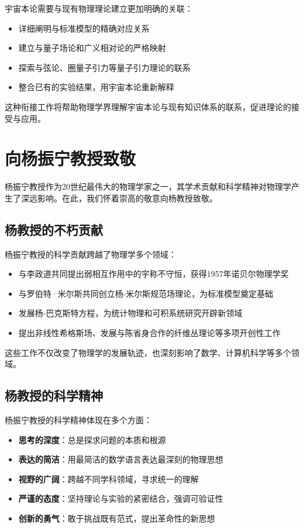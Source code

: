 宇宙本论需要与现有物理理论建立更加明确的关联：

\begin{itemize}
  \item 详细阐明与标准模型的精确对应关系
  \item 建立与量子场论和广义相对论的严格映射
  \item 探索与弦论、圈量子引力等量子引力理论的联系
  \item 整合已有的实验结果，用宇宙本论重新解释
\end{itemize}

这种衔接工作将帮助物理学界理解宇宙本论与现有知识体系的联系，促进理论的接受与应用。

\section{向杨振宁教授致敬}

杨振宁教授作为20世纪最伟大的物理学家之一，其学术贡献和科学精神对物理学产生了深远影响。在此，我们怀着崇高的敬意向杨教授致敬。

\subsection{杨教授的不朽贡献}

杨振宁教授的科学贡献跨越了物理学多个领域：

\begin{itemize}
  \item 与李政道共同提出弱相互作用中的宇称不守恒，获得1957年诺贝尔物理学奖
  \item 与罗伯特·米尔斯共同创立杨-米尔斯规范场理论，为标准模型奠定基础
  \item 发展杨-巴克斯特方程，为统计物理和可积系统研究开辟新领域
  \item 提出非线性希格斯场、发展与陈省身合作的纤维丛理论等多项开创性工作
\end{itemize}

这些工作不仅改变了物理学的发展轨迹，也深刻影响了数学、计算机科学等多个领域。

\subsection{杨教授的科学精神}

杨振宁教授的科学精神体现在多个方面：

\begin{itemize}
  \item \textbf{思考的深度}：总是探求问题的本质和根源
  \item \textbf{表达的简洁}：用最简洁的数学语言表达最深刻的物理思想
  \item \textbf{视野的广阔}：跨越不同学科领域，寻求统一的理解
  \item \textbf{严谨的态度}：坚持理论与实验的紧密结合，强调可验证性
  \item \textbf{创新的勇气}：敢于挑战既有范式，提出革命性的新思想
\end{itemize}

